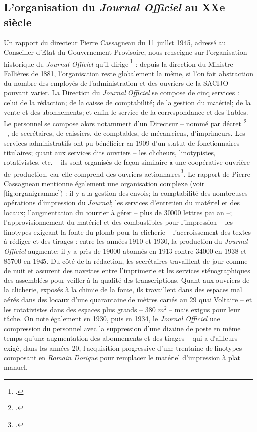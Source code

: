\subsection{L'organisation du \emph{Journal Officiel} au XXe siècle}

Un rapport du directeur Pierre Cassagneau du 11 juillet 1945, adressé au Conseiller d'Etat du Gouvernement Provisoire, nous renseigne sur l'organisation historique du \emph{Journal Officiel} qu'il dirige \footcite[][]{cote6} : depuis la direction du Ministre Fallières de 1881, l'organisation reste globalement la même, si l'on fait abstraction du nombre des employés de l'administration et des ouvriers de la SACIJO pouvant varier. La Direction du \emph{Journal Officiel} se compose de cinq services : celui de la rédaction; de la caisse de comptabilité; de la gestion du matériel; de la vente et des abonnements; et enfin le service de la correspondance et des Tables. Le personnel se compose alors notamment d'un Directeur -- nommé par décret \footcite[][]{cote1} --, de secrétaires, de caissiers, de comptables, de mécaniciens, d'imprimeurs. Les services administratifs ont pu bénéficier en 1909 d'un statut de fonctionnaires titulaires; quant aux services dits ouvriers -- les clicheurs, linotypistes, rotativistes, etc. -- ils sont organisés de façon similaire à une coopérative ouvrière de production, car elle comprend des ouvriers actionnaires\footcite[][]{cote6}. Le rapport de Pierre Cassagneau mentionne également une organisation complexe (voir \ref{fig:organigramme}) : il y a la gestion des envois; la comptabilité des nombreuses opérations d'impression du \emph{Journal}; les services d'entretien du matériel et des locaux; l'augmentation du courrier à gérer --  plus de 30000 lettres par an --; l'approvisionnement du matériel et des combustibles pour l'impression -- les linotypes exigeant la fonte du plomb pour la clicherie -- l'accroissement des textes à rédiger et des tirages : entre les années 1910 et 1930, la production du \emph{Journal Officiel} augmente: il y a près de 19000 abonnés en 1913 contre 34000 en 1938 et 85700 en 1945. Du côté de la rédaction, les secrétaires travaillent de jour comme de nuit et assurent des navettes entre l'imprimerie et les services sténographiques des assemblées pour veiller à la qualité des transcriptions. Quant aux ouvriers de la clicherie, exposés à la chimie de la fonte, ils travaillent dans des espaces mal aérés dans des locaux d'une quarantaine de mètres carrés au 29 quai Voltaire -- et les rotativistes dans des espaces plus grands -- 380 $m^2$ -- mais exigus pour leur tâche. On note également en 1930, puis en 1934, le \emph{Journal Officiel} une compression du personnel avec la suppression d'une dizaine de poste en même temps qu'une augmentation des abonnements et des tirages -- qui a d'ailleurs exigé, dans les années 20, l'acquisition progressive d'une trentaine de linotypes composant en \emph{Romain Dorique} pour remplacer le matériel d'impression à plat manuel.

